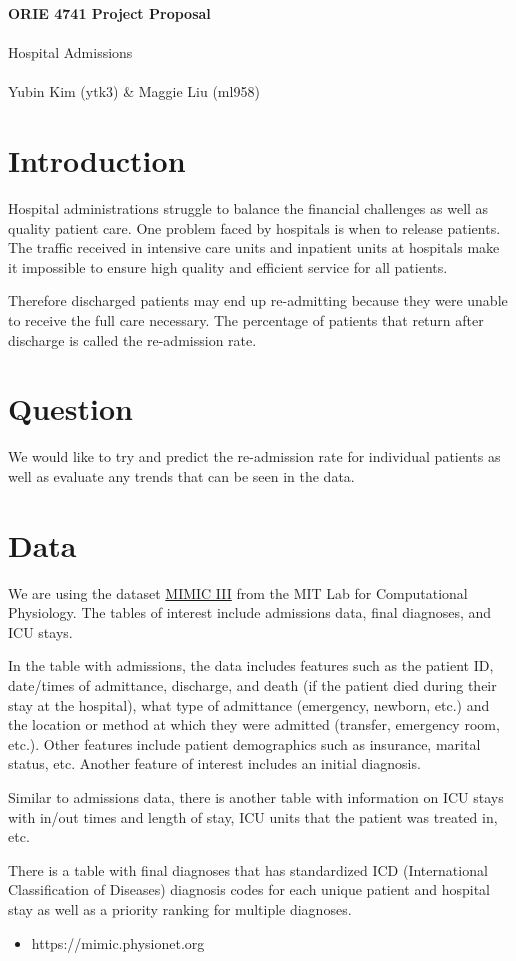 \documentclass[12pt]{article}
\begin{document}
\begin{center}
    \LARGE{\textbf{ORIE 4741 Project Proposal}} \\
    \vspace{1em}\\
    \LARGE{Hospital Admissions} \\
    \vspace{1em}\\
    \normalsize{Yubin Kim (ytk3) \& Maggie Liu (ml958)}
\end{center}


\section{Introduction}

 Hospital administrations struggle to balance the financial challenges as well as quality patient care. One problem faced by hospitals is when to release patients. The traffic received in intensive care units and inpatient units at hospitals make it impossible to ensure high quality and efficient service for all patients. 
 
 Therefore discharged patients may end up re-admitting because they were unable to receive the full care necessary. The percentage of patients that return after discharge is called the re-admission rate. 
 
 \section{Question}
 
 We would like to try and predict the re-admission rate for individual patients as well as evaluate any trends that can be seen in the data.


\section{Data}
We are using the dataset \href{https://mimic.physionet.org}{MIMIC III} from the MIT Lab for Computational Physiology. The tables of interest include admissions data, final diagnoses, and ICU stays.

In the table with admissions, the data includes features such as the patient ID, date/times of admittance, discharge, and death (if the patient died during their stay at the hospital), what type of admittance (emergency, newborn, etc.) and the location or method at which they were admitted (transfer, emergency room, etc.). Other features include patient demographics such as insurance, marital status, etc. Another feature of interest includes an initial diagnosis.

Similar to admissions data, there is another table with information on ICU stays with in/out times and length of stay, ICU units that the patient was treated in, etc.

There is a table with final diagnoses that has standardized ICD (International Classification of Diseases) diagnosis codes for each unique patient and hospital stay as well as a priority ranking for multiple diagnoses.
\begin{itemize}
    \item https://mimic.physionet.org
\end{itemize}
\end{document}
